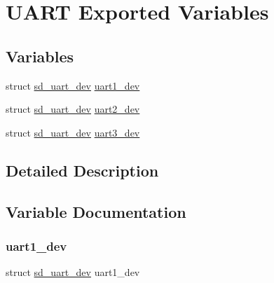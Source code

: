\hypertarget{group___s_d___u_a_r_t___exported___variables}{}\section{U\+A\+RT Exported Variables}
\label{group___s_d___u_a_r_t___exported___variables}
\subsection*{Variables}
\begin{DoxyCompactItemize}
\item 
struct \mbox{\hyperlink{structsd__uart__dev}{sd\+\_\+uart\+\_\+dev}} \mbox{\hyperlink{group___s_d___u_a_r_t___exported___variables_ga34b6075e649bd2f9d6bcef303a9cdce6}{uart1\+\_\+dev}}
\item 
struct \mbox{\hyperlink{structsd__uart__dev}{sd\+\_\+uart\+\_\+dev}} \mbox{\hyperlink{group___s_d___u_a_r_t___exported___variables_ga1c20cdcfbac6bca92bc56a75ccf0b83c}{uart2\+\_\+dev}}
\item 
struct \mbox{\hyperlink{structsd__uart__dev}{sd\+\_\+uart\+\_\+dev}} \mbox{\hyperlink{group___s_d___u_a_r_t___exported___variables_ga16dfd39c3b8134f48efd250c3fd795cc}{uart3\+\_\+dev}}
\end{DoxyCompactItemize}


\subsection{Detailed Description}


\subsection{Variable Documentation}
\mbox{\label{group___s_d___u_a_r_t___exported___variables_ga34b6075e649bd2f9d6bcef303a9cdce6}} 
\subsubsection{\texorpdfstring{uart1\+\_\+dev}{uart1\_dev}}
{\footnotesize\ttfamily struct \mbox{\hyperlink{structsd__uart__dev}{sd\+\_\+uart\+\_\+dev}} uart1\+\_\+dev}



